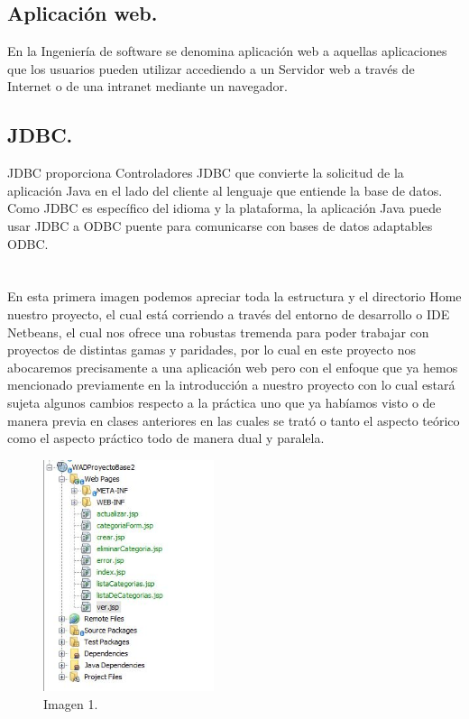 \documentclass[10pt,a4paper]{article}
\begin{document}
\subsection{Aplicación web.}
En la Ingeniería de software se denomina aplicación web a aquellas aplicaciones que los usuarios pueden utilizar accediendo a un Servidor web a través de Internet o de una intranet mediante un navegador.

\subsection{JDBC.}
JDBC proporciona Controladores JDBC que convierte la solicitud de la aplicación Java en el lado del cliente al lenguaje que entiende la base de datos. Como JDBC es específico del idioma y la plataforma, la aplicación Java puede usar JDBC a ODBC puente para comunicarse con bases de datos adaptables ODBC.


\pagebreak

\section{\color{colorIPN}{Desarrollo}}
En esta primera imagen podemos apreciar toda la estructura y el directorio Home nuestro proyecto, el cual está corriendo a través del entorno de desarrollo o IDE Netbeans, el cual nos ofrece una robustas tremenda para poder trabajar con proyectos de distintas gamas y paridades, por lo cual en este proyecto nos abocaremos precisamente a una aplicación web pero con el enfoque que ya hemos mencionado previamente en la introducción a nuestro proyecto con lo cual estará sujeta algunos cambios respecto a la práctica uno que ya habíamos visto o de manera previa en clases anteriores en las cuales se trató o tanto el aspecto teórico como el aspecto práctico todo de manera dual y paralela.

\begin{figure}[h]
\centering
\includegraphics[width=5cm]{1}
\caption{Imagen 1.}
\label{fig:figure1}
\end{figure}
\end{document}
